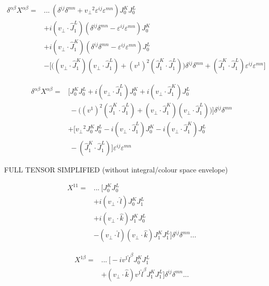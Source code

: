 \begin{equation*}
\begin{split}
\delta^{\alpha \beta} X^{\alpha \beta}=& ...~ (\delta^{ij} \delta^{mn} + {v_\perp}^2 \varepsilon^{ij} \varepsilon^{mn}) J_0 ^K J_0^L \\
& + i (v_\perp \cdot \hat{J}_1^L) (\delta^{ij} \delta^{mn} - \varepsilon^{ij} \varepsilon^{mn}) J_0 ^K  \\
& + i (v_\perp \cdot \hat{J}_1^K) (\delta^{ij} \delta^{mn} - \varepsilon^{ij} \varepsilon^{mn}) J_0^L \\
& - \bigg[ \Big((v_\perp \cdot \hat{J}_1^K) (v_\perp \cdot \hat{J}_1^L) + (v^1)^2 (\hat{J}_1^K \cdot \hat{J}_1^L) \Big) \delta^{ij} \delta^{mn} + (\hat{J}_1^K \cdot \hat{J}_1^L) \varepsilon^{ij}\varepsilon^{mn} \bigg] \end{split}
\end{equation*}

\begin{equation*}
\begin{split}
\delta^{\alpha \beta} X^{\alpha \beta} = & \Big[ J_0^K J_0^L + i(v_\perp \cdot \hat{J}_1^L) J_0^K + i(v_\perp \cdot \hat{J}_1^K)  J_0^L\\
& ~ -\Big((v^1)^2 (\hat{J}_1^K \cdot \hat{J}_1^L)+(v_\perp \cdot \hat{J}_1^K) (v_\perp \cdot \hat{J}_1^L) \Big) \Big] \delta^{ij} \delta^{mn}\\
& + \Big[ {v_\perp}^2 J_0^KJ_0^L - i (v_\perp \cdot \hat{J}_1^L) J_0^K - i (v_\perp \cdot \hat{J}_1^K) J_0^L\\
& ~ - (\hat{J}_1^K \cdot \hat{J}_1^L) \Big] \varepsilon^{ij} \varepsilon^{mn}
\end{split}
\end{equation*}

\newpage 

FULL TENSOR SIMPLIFIED (without integral/colour space envelope)

\begin{equation*}
\begin{split}
 X^{11} = & ... ~ \bigg[ J_0^K J_0^L \\
& +i (v_\perp \cdot \hat{l}) J_0^K J_1^L \\
& +i (v_\perp \cdot \hat{k}) J_1^K J_0^L \\
& - (v_\perp \cdot \hat{l}) (v_\perp \cdot \hat{k}) J_1^K J_1^L
\bigg] \delta^{ij} \delta^{mn}... 
\end{split}
\end{equation*}

\begin{equation*}
\begin{split}
 X^{1 \beta} = & ...~ \bigg[ - i v^1 \hat{l}^\beta J_0^K J_1^L    \\
& + (v_\perp \cdot \hat{k})  v^1 \hat{l}^\beta J_1^K J_1^L  \bigg] \delta^{ij} \delta^{mn} ...
\end{split}
\end{equation*}

